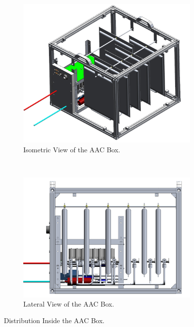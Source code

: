\documentclass[a4paper,12pt,twoside]{article}
\begin{document}
\begin{figure}[H]
    \centering
    \begin{subfigure}[b]{0.47\textwidth}
        \includegraphics[width=\textwidth]{4-experiment-design/img/Mechanical/AAC_isometric_view.png}
         \caption{Isometric View of the AAC Box.}
    \label{iso_aac}
    \end{subfigure}
    ~
    \begin{subfigure}[b]{0.47\textwidth}
        \centering
         \includegraphics[width=\textwidth]{4-experiment-design/img/Mechanical/AAC_lateral_view.png}
        \caption{Lateral View of the AAC Box.}
        \label{lateral_aac}
        \end{subfigure}
    \caption{Distribution Inside the AAC Box.}
    \label{fig:Distribution-AAC}
\end{figure}
\end{document}
